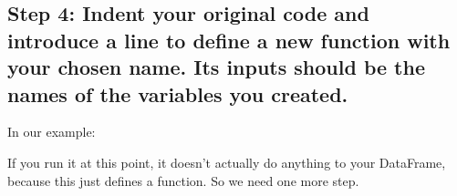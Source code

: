 \documentclass[letterpaper,10pt,english]{sphinxmanual}
\begin{document}
\subsection{Step 4:  Indent your original code and introduce a  line to define a new function with your chosen name.  Its inputs should be the names of the variables you created.}
\label{\detokenize{chapter-7-abstraction:step-4-indent-your-original-code-and-introduce-a-def-line-to-define-a-new-function-with-your-chosen-name-its-inputs-should-be-the-names-of-the-variables-you-created}}
In our example:

\begin{sphinxVerbatim}[commandchars=\\\{\}]
     
    \PYG{p}{[}\PYG{p}{]}  \PYG{p}{[}\PYG{p}{]}    
    \PYG{p}{[}\PYG{p}{]}  \PYG{p}{[}\PYG{p}{]}    
    \PYG{p}{[}\PYG{p}{]}  \PYG{p}{[}\PYG{p}{]}  
\end{sphinxVerbatim}

If you run it at this point, it doesn’t actually do anything to your DataFrame, because this just defines a function.  So we need one more step.
\end{document}
